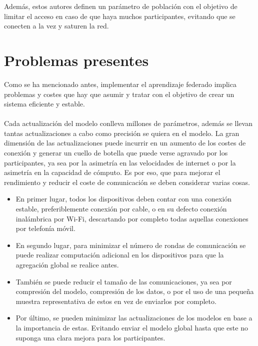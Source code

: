 Además, estos autores definen un parámetro de población con el objetivo de limitar el acceso en caso de que haya muchos participantes, evitando que se conecten a la vez y saturen la red.

\section{Problemas presentes}
Como se ha mencionado antes, implementar el aprendizaje federado implica problemas y costes que hay que asumir y tratar con el objetivo de crear un sistema eficiente y estable. 
\\ \\
Cada actualización del modelo conlleva millones de parámetros, además se llevan tantas actualizaciones a cabo como precisión se quiera en el modelo. La gran dimensión de las actualizaciones puede incurrir en un aumento de los costes de conexión y generar un cuello de botella que puede verse agravado por los participantes, ya sea por la asimetría en las velocidades de internet o por la asimetría en la capacidad de cómputo. Es por eso, que para mejorar el rendimiento y reducir el coste de comunicación se deben considerar varias cosas.
\begin{itemize}
    \item En primer lugar, todos los dispositivos deben contar con una conexión estable, preferiblemente conexión por cable, o en su defecto conexión inalámbrica por Wi-Fi, descartando por completo todas aquellas conexiones por telefonía móvil.
    \item En segundo lugar, para minimizar el número de rondas de comunicación se puede realizar computación adicional en los dispositivos para que la agregación global se realice antes.
    \item También se puede reducir el tamaño de las comunicaciones, ya sea por compresión del modelo, compresión de los datos, o por el uso de una pequeña muestra representativa de estos en vez de enviarlos por completo.
    \item Por último, se pueden minimizar las actualizaciones de los modelos en base a la importancia de estas. Evitando enviar el modelo global hasta que este no suponga una clara mejora para los participantes.
\end{itemize}
